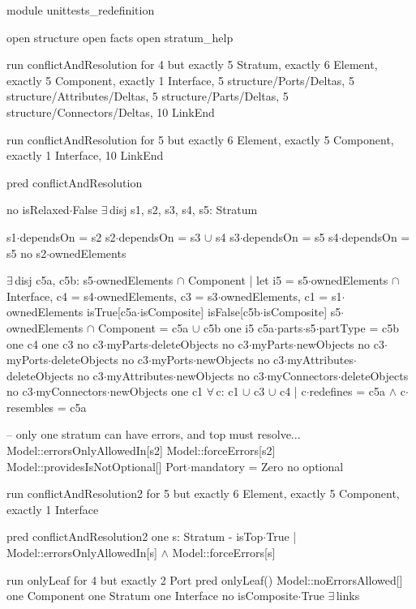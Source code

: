 module unittests_redefinition

open structure
open facts
open stratum_help


run conflictAndResolution for 4 but
  exactly 5 Stratum,
  exactly 6 Element,
  exactly 5 Component,
  exactly 1 Interface,
  5 structure/Ports/Deltas,
  5 structure/Attributes/Deltas,
  5 structure/Parts/Deltas,
  5 structure/Connectors/Deltas,
  10 LinkEnd

run conflictAndResolution for 5 but exactly 6 Element, exactly 5 Component, exactly 1 Interface, 10 LinkEnd

pred conflictAndResolution
{
  no isRelaxed$\cdot$False
  $\exists\,$disj s1, s2, s3, s4, s5: Stratum
  {
    s1$\cdot$dependsOn = s2
    s2$\cdot$dependsOn = s3 $\cup$ s4
    s3$\cdot$dependsOn = s5
    s4$\cdot$dependsOn = s5
    no s2$\cdot$ownedElements
    
    $\exists\,$disj c5a, c5b: s5$\cdot$ownedElements $\cap$ Component |
    let i5 = s5$\cdot$ownedElements $\cap$ Interface,
      c4 = s4$\cdot$ownedElements,
      c3 = s3$\cdot$ownedElements,
      c1 = s1$\cdot$ownedElements
    {
      isTrue[c5a$\cdot$isComposite]
      isFalse[c5b$\cdot$isComposite]
      s5$\cdot$ownedElements $\cap$ Component = c5a $\cup$ c5b
      one i5
      c5a$\cdot$parts$\cdot$s5$\cdot$partType = c5b
      one c4
      one c3
      no c3$\cdot$myParts$\cdot$deleteObjects
      no c3$\cdot$myParts$\cdot$newObjects
      no c3$\cdot$myPorts$\cdot$deleteObjects
      no c3$\cdot$myPorts$\cdot$newObjects
      no c3$\cdot$myAttributes$\cdot$deleteObjects
      no c3$\cdot$myAttributes$\cdot$newObjects
      no c3$\cdot$myConnectors$\cdot$deleteObjects
      no c3$\cdot$myConnectors$\cdot$newObjects
      one c1
      $\forall\,$c: c1 $\cup$ c3 $\cup$ c4 |
        c$\cdot$redefines = c5a $\wedge$ c$\cdot$resembles = c5a
    }    
    
    -- only one stratum can have errors, and top must resolve...
    Model::errorsOnlyAllowedIn[s2]
    Model::forceErrors[s2]
    Model::providesIsNotOptional[]
    Port$\cdot$mandatory = Zero
    no optional
  }
}

run conflictAndResolution2 for 5 but exactly 6 Element, exactly 5 Component, exactly 1 Interface

pred conflictAndResolution2
{
  one s: Stratum - isTop$\cdot$True |
    Model::errorsOnlyAllowedIn[s] $\wedge$ Model::forceErrors[s]
}

run onlyLeaf for 4 but exactly 2 Port
pred onlyLeaf()
{
  Model::noErrorsAllowed[]
  one Component
  one Stratum
  one Interface
  no isComposite$\cdot$True
  $\exists\,$links
}


